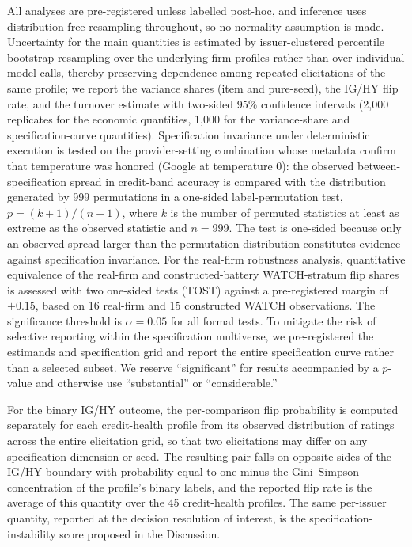 \documentclass[a4paper,fleqn]{cas-sc}
\begin{document}
All analyses are pre-registered unless labelled post-hoc, and inference uses distribution-free resampling
throughout, so no normality assumption is made. Uncertainty for the main quantities is estimated by
issuer-clustered percentile bootstrap resampling over the underlying firm profiles rather than over
individual model calls, thereby preserving dependence among repeated elicitations of the same profile; we
report the variance shares (item and pure-seed), the IG/HY flip rate, and the turnover estimate with
two-sided 95\% confidence intervals (2{,}000 replicates for the economic quantities, 1{,}000 for the
variance-share and specification-curve quantities). Specification invariance under deterministic
execution is tested on the provider-setting combination whose metadata confirm that temperature was
honored (Google at temperature 0): the observed between-specification spread in credit-band accuracy is
compared with the distribution generated by 999 permutations in a one-sided label-permutation test,
$p=(k{+}1)/(n{+}1)$, where $k$ is the number of permuted statistics at least as extreme as the observed
statistic and $n=999$. The test is one-sided because only an observed spread larger than the permutation
distribution constitutes evidence against specification invariance. For the real-firm robustness
analysis, quantitative equivalence of the real-firm and constructed-battery WATCH-stratum flip shares is
assessed with two one-sided tests (TOST) against a pre-registered margin of $\pm0.15$, based on 16
real-firm and 15 constructed WATCH observations. The significance threshold is $\alpha=0.05$ for all
formal tests. To mitigate the risk of selective reporting within the specification multiverse, we
pre-registered the estimands and specification grid and report the entire specification curve rather than
a selected subset. We reserve ``significant'' for results accompanied by a $p$-value and otherwise use
``substantial'' or ``considerable.''

For the binary IG/HY outcome, the per-comparison flip probability is computed separately for each
credit-health profile from its observed distribution of ratings across the entire elicitation grid, so
that two elicitations may differ on any specification dimension or seed. The resulting pair falls on
opposite sides of the IG/HY boundary with probability equal to one minus the Gini--Simpson concentration
of the profile's binary labels, and the reported flip rate is the average of this quantity over the 45
credit-health profiles. The same per-issuer quantity, reported at the decision resolution of interest, is
the specification-instability score proposed in the Discussion.
\end{document}
